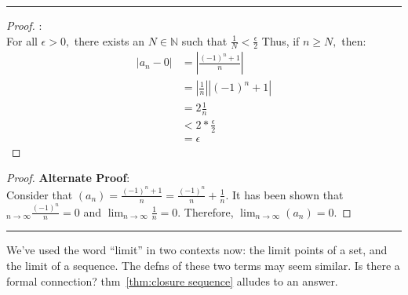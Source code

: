 \documentclass[openany, amssymb, psamsfonts]{amsart}
\newcommand{\bbN}{\mathbb{N}}
\theoremstyle{definition}
\numberwithin{equation}{section}
\begin{document}
\vspace{4pt}     \hrule   \vspace{4pt}\begin{proof}:\\
For all $\epsilon>0,$ there exists an $N\in \bbN$ such that $\frac{1}{N}<\frac{\epsilon}{2}$ Thus, if $n\geq N,$ then:
\begin{align*}
|a_n - 0| &= |\frac{(-1)^n+1}{n}|\\
&= |\frac{1}{n}||(-1)^n+1|\\
&= 2\frac{1}{n}\\
&< 2* \frac{\epsilon}{2}\\
&= \epsilon
\end{align*}
\end{proof}\begin{proof}\textbf{Alternate Proof}:\\
    Consider that $(a_n) = \frac{(-1)^n  +1}{n} = \frac{(-1)^n}{n} + \frac{1}{n}.$ It has been shown that $\displaystyle_{n\to \infty}\frac{(-1)^n}{n} = 0$ and $\displaystyle\lim_{n\to\infty}\frac{1}{n} = 0.$ Therefore, $\displaystyle\lim_{n\to \infty}(a_n) = 0.$
\end{proof}\vspace{4pt}     \hrule   \vspace{4pt}


We've used the word ``limit'' in two contexts now: the limit points of a set, and the limit of a sequence. The defns of these two terms may seem similar. Is there a formal connection? thm~\ref{thm:closure sequence} alludes to an answer. 
\end{document}
